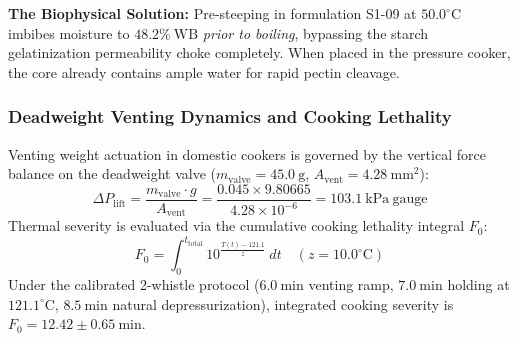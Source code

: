 \documentclass[10pt,a4paper]{article}
\begin{document}
\textbf{The Biophysical Solution:} Pre-steeping in formulation S1-09 at $50.0^\circ\mathrm{C}$ imbibes moisture to $48.2\%\ \mathrm{WB}$ \textit{prior to boiling}, bypassing the starch gelatinization permeability choke completely. When placed in the pressure cooker, the core already contains ample water for rapid pectin cleavage.

\subsubsection{Deadweight Venting Dynamics and Cooking Lethality}
Venting weight actuation in domestic cookers is governed by the vertical force balance on the deadweight valve ($m_{\mathrm{valve}} = 45.0\ \mathrm{g}$, $A_{\mathrm{vent}} = 4.28\ \mathrm{mm^2}$):
\begin{equation}
\Delta P_{\mathrm{lift}} = \frac{m_{\mathrm{valve}} \cdot g}{A_{\mathrm{vent}}} = \frac{0.045 \times 9.80665}{4.28 \times 10^{-6}} = 103.1\ \mathrm{kPa\ gauge}
\end{equation}
Thermal severity is evaluated via the cumulative cooking lethality integral $F_0$:
\begin{equation}
F_0 = \int_0^{t_{\mathrm{total}}} 10^{\frac{T(t) - 121.1}{z}}\ dt \quad (z = 10.0^\circ\mathrm{C})
\end{equation}
Under the calibrated 2-whistle protocol ($6.0\ \mathrm{min}$ venting ramp, $7.0\ \mathrm{min}$ holding at $121.1^\circ\mathrm{C}$, $8.5\ \mathrm{min}$ natural depressurization), integrated cooking severity is $F_0 = 12.42 \pm 0.65\ \mathrm{min}$.
\end{document}
